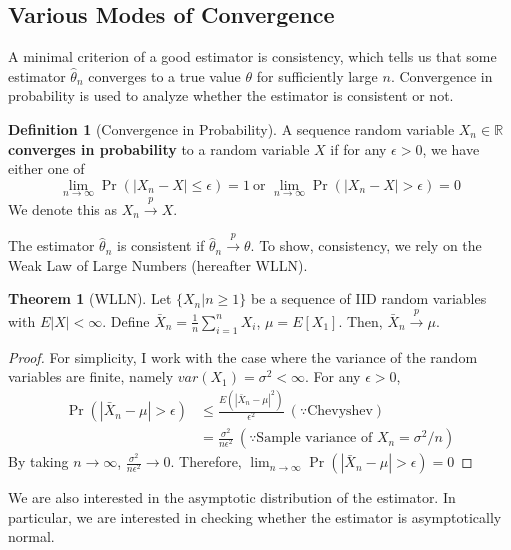 \documentclass[12pt]{article}
\theoremstyle{definition}
\newtheorem{definition}{Definition}[section]
\theoremstyle{property}
\theoremstyle{example}
\newtheorem{theorem}{Theorem}[section]
\begin{document}
\subsection{Various Modes of Convergence}
A minimal criterion of a good estimator is consistency, which tells us that some estimator $\hat{\theta}_n$ converges to a true value $\theta$ for sufficiently large $n$. Convergence in probability is used to analyze whether the estimator is consistent or not. 
\begin{mdframed}[backgroundcolor=blue!5] 
\begin{definition}[Convergence in Probability]
A sequence random variable $X_n\in \mathbb{R}$ \textbf{converges in probability} to a random variable $X$ if for any $\epsilon>0$, we have either one of 
\[
\lim_{n\to\infty}\Pr(|X_n-X|\leq\epsilon)=1 \ \text{or }\lim_{n\to\infty}\Pr(|X_n-X|>\epsilon)=0
\]
We denote this as $X_n\xrightarrow{p}X$. 
\end{definition}
\end{mdframed} \par
The estimator $\hat{\theta}_n$ is consistent if $\hat{\theta}_n\xrightarrow{p}\theta$. To show, consistency, we rely on the Weak Law of Large Numbers (hereafter WLLN). 
\begin{mdframed}[backgroundcolor=green!5] 
\begin{theorem}[WLLN] Let $\{X_n|n\geq1\}$ be a sequence of IID random variables with $E|X|<\infty$. Define $\bar{X}_n=\frac{1}{n}\sum_{i=1}^nX_i$, $\mu=E[X_1]$. Then, $\bar{X}_n\xrightarrow{p}\mu$. 
\begin{proof}
For simplicity, I work with the case where the variance of the random variables are finite, namely $var(X_1)=\sigma^2<\infty$. For any $\epsilon>0$, 
\[
\begin{aligned}
\Pr(|\bar{X}_n-\mu|>\epsilon)&\leq\frac{E(|\bar{X}_n-\mu|^2)}{\epsilon^2} \ (\because \text{Chevyshev})\\
&=\frac{\sigma^2}{n\epsilon^2} \ (\because\text{Sample variance of $X_n$}=\sigma^2/n)
\end{aligned}
\]
By taking $n\to\infty$, $\frac{\sigma^2}{n\epsilon^2}\to0$. Therefore, $\lim_{n\to\infty}\Pr(|\bar{X}_n-\mu|>\epsilon)=0$
\end{proof}
\end{theorem}
\end{mdframed}\par
We are also interested in the asymptotic distribution of the estimator. In particular, we are interested in checking whether the estimator is asymptotically normal. 
\end{document}
